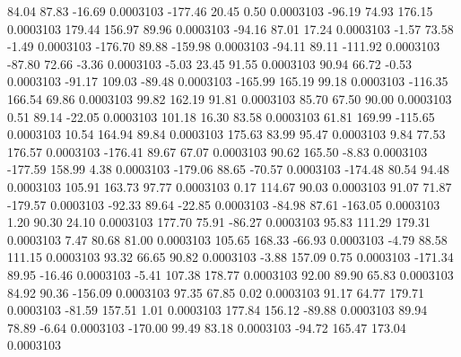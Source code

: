        84.04       87.83      -16.69     0.0003103
     -177.46       20.45        0.50     0.0003103
      -96.19       74.93      176.15     0.0003103
      179.44      156.97       89.96     0.0003103
      -94.16       87.01       17.24     0.0003103
       -1.57       73.58       -1.49     0.0003103
     -176.70       89.88     -159.98     0.0003103
      -94.11       89.11     -111.92     0.0003103
      -87.80       72.66       -3.36     0.0003103
       -5.03       23.45       91.55     0.0003103
       90.94       66.72       -0.53     0.0003103
      -91.17      109.03      -89.48     0.0003103
     -165.99      165.19       99.18     0.0003103
     -116.35      166.54       69.86     0.0003103
       99.82      162.19       91.81     0.0003103
       85.70       67.50       90.00     0.0003103
        0.51       89.14      -22.05     0.0003103
      101.18       16.30       83.58     0.0003103
       61.81      169.99     -115.65     0.0003103
       10.54      164.94       89.84     0.0003103
      175.63       83.99       95.47     0.0003103
        9.84       77.53      176.57     0.0003103
     -176.41       89.67       67.07     0.0003103
       90.62      165.50       -8.83     0.0003103
     -177.59      158.99        4.38     0.0003103
     -179.06       88.65      -70.57     0.0003103
     -174.48       80.54       94.48     0.0003103
      105.91      163.73       97.77     0.0003103
        0.17      114.67       90.03     0.0003103
       91.07       71.87     -179.57     0.0003103
      -92.33       89.64      -22.85     0.0003103
      -84.98       87.61     -163.05     0.0003103
        1.20       90.30       24.10     0.0003103
      177.70       75.91      -86.27     0.0003103
       95.83      111.29      179.31     0.0003103
        7.47       80.68       81.00     0.0003103
      105.65      168.33      -66.93     0.0003103
       -4.79       88.58      111.15     0.0003103
       93.32       66.65       90.82     0.0003103
       -3.88      157.09        0.75     0.0003103
     -171.34       89.95      -16.46     0.0003103
       -5.41      107.38      178.77     0.0003103
       92.00       89.90       65.83     0.0003103
       84.92       90.36     -156.09     0.0003103
       97.35       67.85        0.02     0.0003103
       91.17       64.77      179.71     0.0003103
      -81.59      157.51        1.01     0.0003103
      177.84      156.12      -89.88     0.0003103
       89.94       78.89       -6.64     0.0003103
     -170.00       99.49       83.18     0.0003103
      -94.72      165.47      173.04     0.0003103
